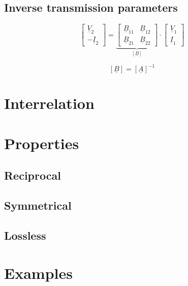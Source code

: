 \documentclass{article}[11pt]
\begin{document}
\subsection{Inverse transmission parameters}


\begin{equation}
\begin{bmatrix}
 \underline{V}_{\mathrm{2}} \\
-\underline{I}_{\mathrm{2}} 
\end{bmatrix}
=
\underbrace{
\begin{bmatrix}
\underline{B}_{\mathrm{11}} & \underline{B}_{\mathrm{12}} \\
\underline{B}_{\mathrm{21}} & \underline{B}_{\mathrm{22}}
\end{bmatrix}
}_{\left[\underline{B}\right]}
\cdot
\begin{bmatrix}
\underline{V}_{\mathrm{1}} \\
\underline{I}_{\mathrm{1}} 
\end{bmatrix}
\end{equation}

\begin{equation}
\left[\underline{B}\right] = \left[\underline{A}\right]^{-1}
\end{equation}

\section{Interrelation}


\section{Properties}

\subsection{Reciprocal}
\subsection{Symmetrical}
\subsection{Lossless}

\section{Examples}
\end{document}
